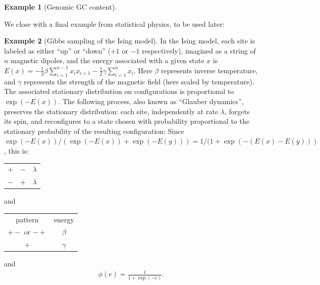 \documentclass{article}
\theoremstyle{plain}
\theoremstyle{definition}
\newtheorem{example}{Example}[section]
\begin{document}
\begin{example}[Genomic GC content]
\end{example}

We close with a final example from statistical physics, to be used later:

\begin{example}[Gibbs sampling of the Ising model]
    In the Ising model, each site is labeled as either ``up'' or ``down'' ($+1$ or $-1$ respectively),
    imagined as a string of $n$ magnetic dipoles,
    and the energy associated with a given state $x$ is $E(x) = - \frac{1}{2} \beta \sum_{i=1}^{n-1} x_i x_{i+1} - \frac{1}{2} \gamma \sum_{i=1}^n x_i$.
    Here $\beta$ represents inverse temperature, and $\gamma$ represents the strength of the magnetic field (here scaled by temperature).
    The associated stationary distribution on configurations is proportional to $\exp(-E(x))$.
    The following process, also known as ``Glauber dynamics'', preserves the stationary distribution:
    each site, independently at rate $\lambda$,
    forgets its spin,
    and reconfigures to a state chosen with probability proportional to the stationary probability of the resulting configuration:
    Since $\exp(-E(x))/(\exp(-E(x))+\exp(-E(y))) = 1/(1+\exp(-(E(x)-E(y)))$,
    this is:
    \begin{center}
        \begin{tabular}{c@{\quad$\to$\quad}c@{\quad at rate\quad }c}
          $+$  &   $-$   &  $\lambda$ \\
          $-$  &   $+$   &  $\lambda$
        \end{tabular}
        \qquad and \qquad
        \begin{tabular}{cc}
        pattern  &  energy \\
        $+-$ or $-+$  &   $\beta$ \\
        $+$ &   $\gamma$
        \end{tabular}
    \end{center}
    and
    \begin{align*}
        \phi(e) = \frac{1}{1+\exp(-e)} .
    \end{align*}
\end{example}
\end{document}
